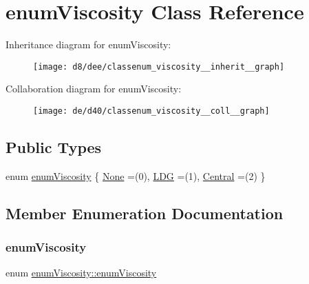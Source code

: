 \hypertarget{classenum_viscosity}{}\section{enum\+Viscosity Class Reference}
\label{classenum_viscosity}


Inheritance diagram for enum\+Viscosity\+:
\nopagebreak
\begin{figure}[H]
\begin{center}
\leavevmode
\texttt{[image: d8/dee/classenum\_viscosity\_\_inherit\_\_graph]}
\end{center}
\end{figure}


Collaboration diagram for enum\+Viscosity\+:
\nopagebreak
\begin{figure}[H]
\begin{center}
\leavevmode
\texttt{[image: de/d40/classenum\_viscosity\_\_coll\_\_graph]}
\end{center}
\end{figure}
\subsection*{Public Types}
\begin{DoxyCompactItemize}
\item 
enum \hyperlink{classenum_viscosity_aac99b73ed1365c9f54bddd642a5478b9}{enum\+Viscosity} \{ \hyperlink{classenum_viscosity_aac99b73ed1365c9f54bddd642a5478b9a85e4623a4351917d3527de4584418969}{None} =(0), 
\hyperlink{classenum_viscosity_aac99b73ed1365c9f54bddd642a5478b9aec58fa737b2e057f294d4dd83f2b2210}{L\+DG} =(1), 
\hyperlink{classenum_viscosity_aac99b73ed1365c9f54bddd642a5478b9ab2390b21c0a06411137d2bdde5ff3ccd}{Central} =(2)
 \}
\end{DoxyCompactItemize}


\subsection{Member Enumeration Documentation}
\mbox{\label{classenum_viscosity_aac99b73ed1365c9f54bddd642a5478b9}} 
\subsubsection{\texorpdfstring{enum\+Viscosity}{enumViscosity}}
{\footnotesize\ttfamily enum \hyperlink{classenum_viscosity_aac99b73ed1365c9f54bddd642a5478b9}{enum\+Viscosity\+::enum\+Viscosity}}

